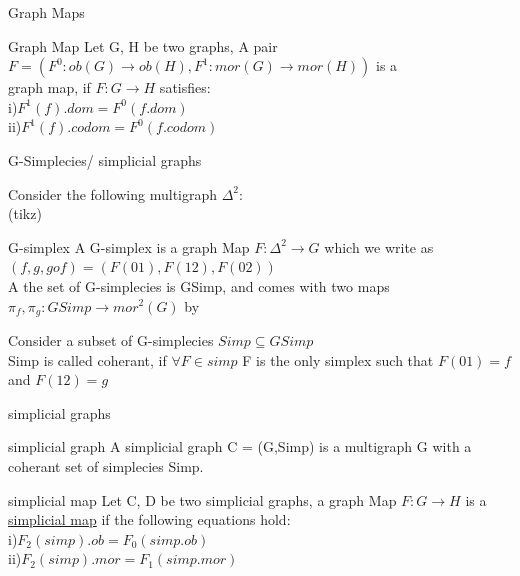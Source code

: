 \documentclass[11pt]{beamer}
\begin{document}
\begin{frame}{Graph Maps}
\begin{block}{Graph Map}
Let G, H be two graphs, A pair $F = (F^0:ob(G) \to ob(H),F^1:mor(G) \to mor(H))$ is a \\graph map, if $F:G \to H$ satisfies:\\
i)$F^1(f).dom = F^0(f.dom)$\\
ii)$F^1(f).codom = F^0(f.codom)$

\end{block}
\end{frame}

\begin{frame}{G-Simplecies/ simplicial graphs}

Consider the following multigraph  $\Delta^2$:\\
(tikz)\\
\begin{block}{G-simplex}
A G-simplex is a graph Map $F:\Delta^2 \to G$ which we write as $(f,g,gof) = (F(01),F(12),F(02))$\\
A the set of G-simplecies is GSimp, and comes with two maps$\pi_f,\pi_g:GSimp \to mor^2(G)$ by \\ 
\end{block}
Consider a subset of G-simplecies $Simp \subseteq GSimp$\\
Simp is called coherant, if $\forall F \in simp$ F is the only simplex such that $F(01) = f$ and $F(12) = g$
\\

\end{frame}


\begin{frame}{simplicial graphs}
\begin{block}{simplicial graph}
A simplicial graph C = (G,Simp) is a multigraph G with a coherant set of simplecies Simp.
\end{block}
    \begin{block}{simplicial map}
        Let C, D be two simplicial graphs, a graph Map $F:G \to H$ is a \underline{simplicial map} if the following equations hold:\\
        i)$F_2(simp).ob = F_0(simp.ob)$\\
        ii)$F_2(simp).mor = F_1(simp.mor)$
    \end{block}
\end{frame}
\end{document}
